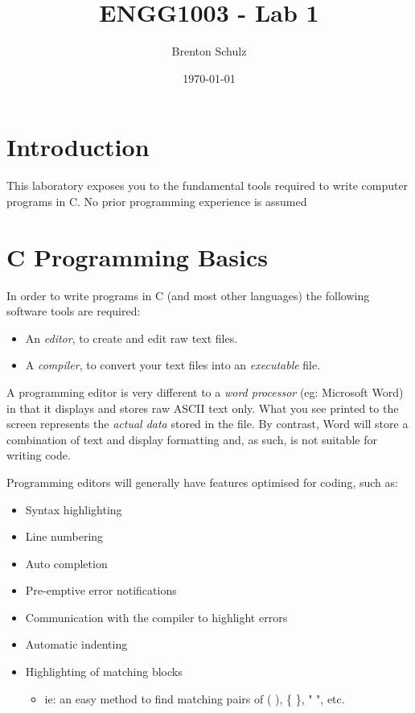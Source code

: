 \documentclass{lab}
\title{ENGG1003 - Lab 1}
\author{Brenton Schulz}
\date{\today}
\begin{document}
\maketitle

\section{Introduction}
This laboratory exposes you to the fundamental tools required to write computer programs in C. No prior programming experience is assumed

\section{C Programming Basics}
In order to write programs in C (and most other languages) the following software tools are required:

\begin{itemize}
\item An \textit{editor}, to create and edit raw text files.
\item A \textit{compiler}, to convert your text files into an \textit{executable} file.
\end{itemize}

A programming editor is very different to a \textit{word processor} (eg: Microsoft Word) in that it displays and stores raw ASCII text only. What you see printed to the screen represents the \textit{actual data} stored in the file. By contrast, Word will store a combination of text and display formatting and, as such, is not suitable for writing code.

Programming editors will generally have features optimised for coding, such as:

\begin{itemize}
\item Syntax highlighting
\item Line numbering
\item Auto completion
\item Pre-emptive error notifications
\item Communication with the compiler to highlight errors
\item Automatic indenting
\item Highlighting of matching blocks 
	\begin{itemize}
		\item ie: an easy method to find matching pairs of ( ), \{ \}, " ", etc.
	\end{itemize}
\end{itemize}
\end{document}
